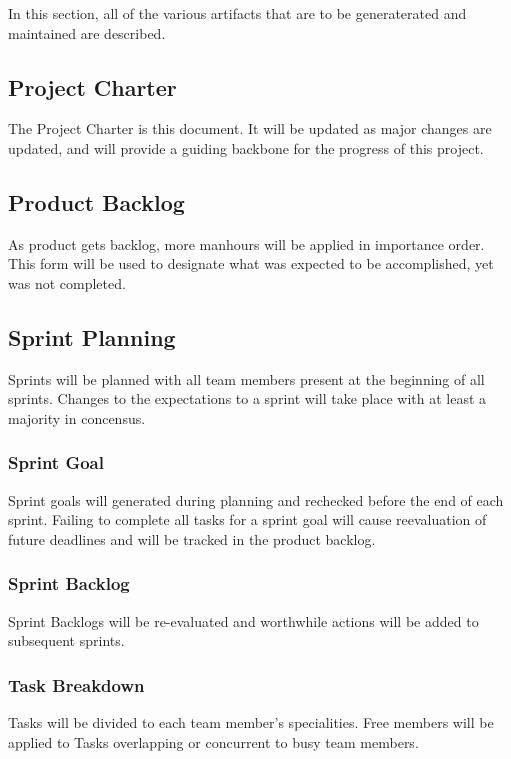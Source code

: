 \quad \quad In this section, all of the various artifacts that are to be generaterated and 
maintained are described.

\subsection{Project Charter}
\quad \quad The Project Charter is this document. It will be updated as major changes are 
updated, and will provide a guiding backbone for the progress of this project.

\subsection{Product Backlog}
\quad \quad As product gets backlog, more manhours will be applied in importance order. This 
form will be used to designate what was expected to be accomplished, yet was not 
completed.

\subsection{Sprint Planning}
\quad \quad Sprints will be planned with all team members present at the beginning of all 
sprints. Changes to the expectations to a sprint will take place with at least a 
majority in concensus.

\subsubsection{Sprint Goal}
\quad \quad Sprint goals will generated during planning and rechecked before the end of each 
sprint. Failing to complete all tasks for a sprint goal will cause reevaluation of 
future deadlines and will be tracked in the product backlog.

\subsubsection{Sprint Backlog}
\quad \quad Sprint Backlogs will be re-evaluated and worthwhile actions will be added to 
subsequent sprints.

\subsubsection{Task Breakdown}
\quad \quad Tasks will be divided to each team member's specialities. Free members will be 
applied to Tasks overlapping or concurrent to busy team members.


